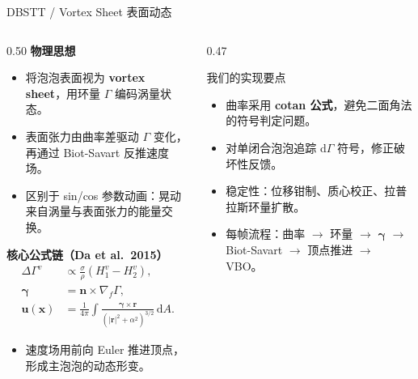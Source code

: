 \documentclass[11pt,aspectratio=169]{beamer}
\begin{document}
\begin{frame}{DBSTT / Vortex Sheet 表面动态}
  \scriptsize
  \begin{columns}[T]
    \begin{column}{0.50\linewidth}
      \textbf{物理思想}
      \begin{itemize}
        \setlength{\itemsep}{0.25em}
        \item 将泡泡表面视为 \textbf{vortex sheet}，用环量 \(\Gamma\) 编码涡量状态。
        \item 表面张力由曲率差驱动 \(\Gamma\) 变化，再通过 Biot-Savart 反推速度场。
        \item 区别于 sin/cos 参数动画：晃动来自涡量与表面张力的能量交换。
      \end{itemize}
      \vspace{0.2em}
      \textbf{核心公式链（Da et al.\ 2015）}
      \[
        \begin{aligned}
          \Delta\Gamma^v &\propto \frac{\sigma}{\rho}(H_1^v-H_2^v),\\
          \boldsymbol{\gamma} &= \mathbf{n}\times\nabla_f\Gamma,\\
          \mathbf{u}(\mathbf{x})
          &=\frac{1}{4\pi}\int
          \frac{\boldsymbol{\gamma}\times\mathbf{r}}
          {(|\mathbf{r}|^2+\alpha^2)^{3/2}}\,\mathrm{d}A.
        \end{aligned}
      \]
      \vspace{-0.5em}
      \begin{itemize}
        \setlength{\itemsep}{0.15em}
        \item 速度场用前向 Euler 推进顶点，形成主泡泡的动态形变。
      \end{itemize}
    \end{column}
    \begin{column}{0.47\linewidth}
      \begin{block}{我们的实现要点}
        \begin{itemize}
          \setlength{\itemsep}{0.35em}
          \item 曲率采用 \textbf{cotan 公式}，避免二面角法的符号判定问题。
          \item 对单闭合泡泡追踪 d\(\Gamma\) 符号，修正破坏性反馈。
          \item 稳定性：位移钳制、质心校正、拉普拉斯环量扩散。
          \item 每帧流程：曲率 \(\rightarrow\) 环量 \(\rightarrow\) \(\boldsymbol{\gamma}\) \(\rightarrow\) Biot-Savart \(\rightarrow\) 顶点推进 \(\rightarrow\) VBO。
        \end{itemize}
      \end{block}
      
    \end{column}
  \end{columns}
\end{frame}
\end{document}
